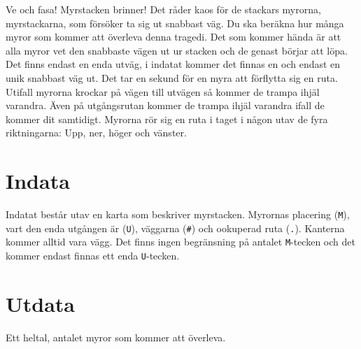 
Ve och fasa! Myrstacken brinner! Det råder kaos för de stackars
myrorna, myrstackarna, som försöker ta sig ut snabbast väg. Du ska
beräkna hur många myror som kommer att överleva denna tragedi.
Det som kommer hända är att alla myror vet den snabbaste vägen ut
ur stacken och de genast börjar att löpa. Det finns endast en enda
utväg, i indatat kommer det finnas en och endast en unik snabbast väg
ut. Det tar en sekund för en myra att förflytta sig en ruta. Utifall
myrorna krockar på vägen till utvägen så kommer de trampa ihjäl
varandra. Även på utgångsrutan kommer de trampa ihjäl varandra ifall
de kommer dit samtidigt. Myrorna rör sig en ruta i taget i någon
utav de fyra riktningarna: Upp, ner, höger och vänster.

\section*{Indata}

Indatat består utav en karta som beskriver myrstacken. Myrornas
placering (\texttt{M}), vart den enda utgången är (\texttt{U}),
väggarna (\texttt{#}) och ookuperad ruta (\texttt{.}). Kanterna
kommer alltid vara vägg. Det finns ingen begränsning på
antalet \texttt{M}-tecken och det kommer endast finnas ett enda
\texttt{U}-tecken.

\section*{Utdata}

Ett heltal, antalet myror som kommer att överleva.
